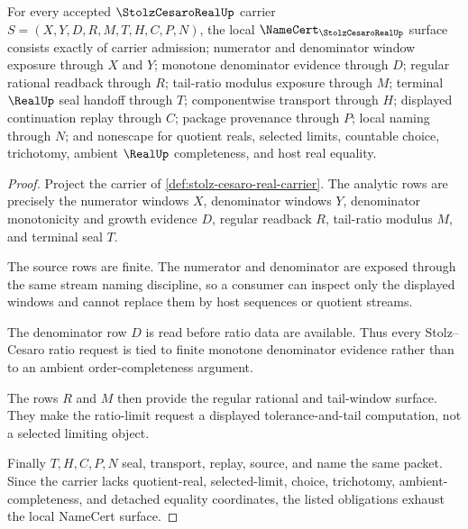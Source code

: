 \begin{theorem}
\label{thm:stolz-cesaro-real-namecert-obligations}
For every accepted $\StolzCesaroRealUp$ carrier $S=(X,Y,D,R,M,T,H,C,P,N)$, the local $\NameCert_{\StolzCesaroRealUp}$ surface consists exactly of carrier admission; numerator and denominator window exposure through $X$ and $Y$; monotone denominator evidence through $D$; regular rational readback through $R$; tail-ratio modulus exposure through $M$; terminal $\RealUp$ seal handoff through $T$; componentwise transport through $H$; displayed continuation replay through $C$; package provenance through $P$; local naming through $N$; and nonescape for quotient reals, selected limits, countable choice, trichotomy, ambient $\RealUp$ completeness, and host real equality.
\end{theorem}
\begin{proof}
Project the carrier of \autoref{def:stolz-cesaro-real-carrier}. The analytic rows are precisely the numerator windows $X$, denominator windows $Y$, denominator monotonicity and growth evidence $D$, regular readback $R$, tail-ratio modulus $M$, and terminal seal $T$.

The source rows are finite. The numerator and denominator are exposed through the same stream naming discipline, so a consumer can inspect only the displayed windows and cannot replace them by host sequences or quotient streams.

The denominator row $D$ is read before ratio data are available. Thus every Stolz--Cesaro ratio request is tied to finite monotone denominator evidence rather than to an ambient order-completeness argument.

The rows $R$ and $M$ then provide the regular rational and tail-window surface. They make the ratio-limit request a displayed tolerance-and-tail computation, not a selected limiting object.

Finally $T,H,C,P,N$ seal, transport, replay, source, and name the same packet. Since the carrier lacks quotient-real, selected-limit, choice, trichotomy, ambient-completeness, and detached equality coordinates, the listed obligations exhaust the local NameCert surface.
\end{proof}

